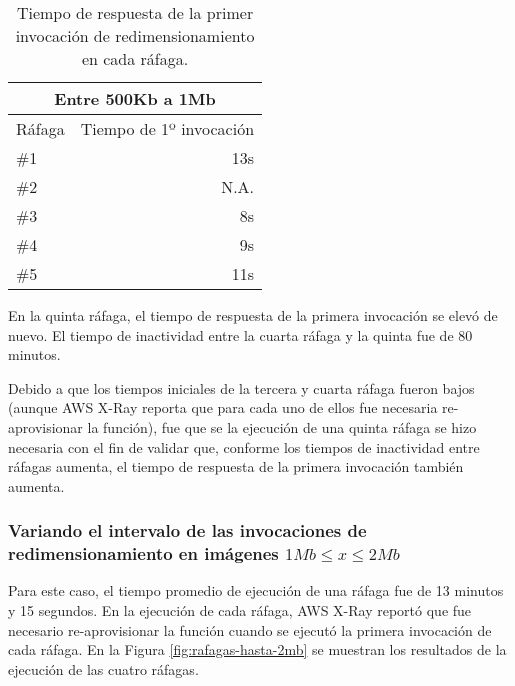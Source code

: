 \begin{table}
    \centering
    \begin{tabular}{l|r}
        \toprule[1.5pt]
        \multicolumn{2}{c}{\textbf{Entre 500Kb a 1Mb}} \\
        \midrule
        Ráfaga  & Tiempo de 1º invocación \\
        \midrule
        \#1  & 13s \\
        \#2  & N.A. \\        
        \#3  & 8s \\        
        \#4  & 9s \\        
        \#5  & 11s \\                                
        \bottomrule[1.5pt]
    \end{tabular}
    \caption{Tiempo de respuesta de la primer invocación de redimensionamiento en cada ráfaga.}
    \label{table:rafagas-hasta-1mb-tiempos-primera-invocacion}
\end{table}

En la quinta ráfaga, el tiempo de respuesta de la primera invocación se elevó de nuevo. El tiempo de inactividad entre la cuarta ráfaga y la quinta fue de 80 minutos. 

Debido a que los tiempos iniciales de la tercera y cuarta ráfaga fueron bajos (aunque AWS X-Ray reporta que para cada uno de ellos fue necesaria re-aprovisionar la función), fue que se la ejecución de una quinta ráfaga se hizo necesaria con el fin de validar que, conforme los tiempos de inactividad entre ráfagas aumenta, el tiempo de respuesta de la primera invocación también aumenta. 

\subsubsection{Variando el intervalo de las invocaciones de redimensionamiento en imágenes $1Mb \leq x \leq 2Mb$}

Para este caso, el tiempo promedio de ejecución de una ráfaga fue de 13 minutos y 15 segundos. En la ejecución de cada ráfaga, AWS X-Ray reportó que fue necesario re-aprovisionar la función cuando se ejecutó la primera invocación de cada ráfaga. En la Figura \ref{fig:rafagas-hasta-2mb} se muestran los resultados de la ejecución de las cuatro ráfagas.

